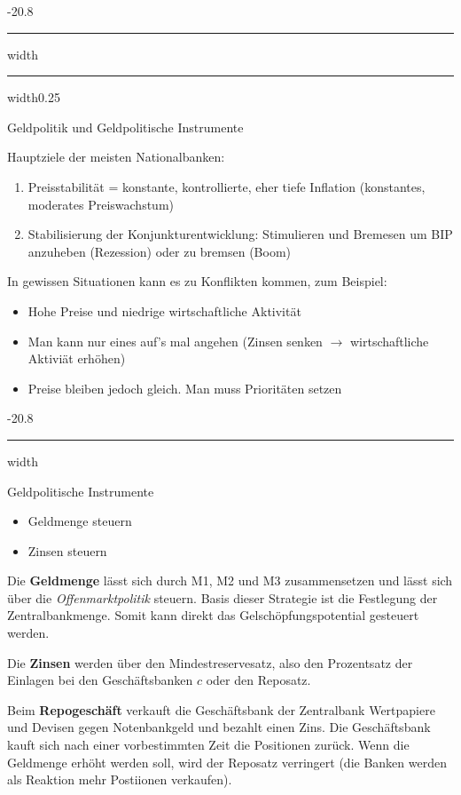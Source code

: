 \documentclass[9pt, landscape, fleqn]{scrartcl}
\makeatletter
\renewcommand{\subsection}{\@startsection{subsection}{1}{0mm}%
{-2\baselineskip}{0.8\baselineskip}%
{\hrule depth 0.2pt width\columnwidth\hrule depth0.75pt
width0.25\columnwidth\vspace*{1.2em}\large\bfseries\rmfamily}}
\renewcommand{\subsubsection}{\@startsection{subsubsection}{1}{0mm}%
{-2\baselineskip}{0.8\baselineskip}%
{\hrule depth 0.2pt width\columnwidth\vspace*{1.2em}\normalsize\bfseries\rmfamily}}
\makeatother
\begin{document}
\begin{multicols*}{3}
\subsection{Geldpolitik und Geldpolitische Instrumente}

Hauptziele der meisten Nationalbanken:

\begin{enumerate}
    \item Preisstabilität = konstante, kontrollierte, eher tiefe Inflation (konstantes, moderates Preiswachstum)
    \item Stabilisierung der Konjunkturentwicklung: Stimulieren und Bremesen um BIP anzuheben (Rezession) oder zu bremsen (Boom)
\end{enumerate}

In gewissen Situationen kann es zu Konflikten kommen, zum Beispiel: 

\begin{itemize}
    \item Hohe Preise und niedrige wirtschaftliche Aktivität
    \item Man kann nur eines auf's mal angehen (Zinsen senken $\rightarrow$ wirtschaftliche Aktiviät erhöhen)
    \item Preise bleiben jedoch gleich. Man muss Prioritäten setzen 
\end{itemize}

\subsubsection{Geldpolitische Instrumente}

\begin{itemize}
    \item Geldmenge steuern 
    \item Zinsen steuern 
\end{itemize}

Die \textbf{Geldmenge} lässt sich durch M1, M2 und M3 zusammensetzen und lässt sich über die \emph{Offenmarktpolitik} steuern. Basis dieser Strategie ist die Festlegung der Zentralbankmenge. Somit kann direkt das Gelschöpfungspotential gesteuert werden. \newline 

Die \textbf{Zinsen} werden über den Mindestreservesatz, also den Prozentsatz der Einlagen bei den Geschäftsbanken $c$ oder den Reposatz. \newline 

Beim \textbf{Repogeschäft} verkauft die Geschäftsbank der Zentralbank Wertpapiere und Devisen gegen Notenbankgeld und bezahlt einen Zins. Die Geschäftsbank kauft sich nach einer vorbestimmten Zeit die Positionen zurück. Wenn die Geldmenge erhöht werden soll, wird der Reposatz verringert (die Banken werden als Reaktion mehr Postiionen verkaufen). \newline 


\end{multicols*}
\end{document}
